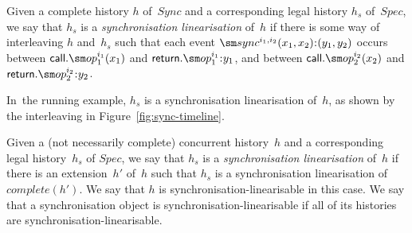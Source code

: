 \begin{definition}
Given a complete history $h$ of~$Sync$ and a corresponding legal history $h_s$
of~$Spec$, we say that $h_s$ is a \emph{synchronisation linearisation} of~$h$
if there is some way of interleaving $h$ and~$h_s$ such that each event
$\sync^{i_1, i_2}(x_1, x_2)\:: (y_1, y_2)$ occurs between
$\call.\op_1^{i_1}(x_1)$ and $\return.\op_1^{i_1}\::y_1$, and between
$\call.\op_2^{i_2}(x_2)$ and $\return.\op_2^{i_2}\::y_2$.
\end{definition}
%
In~the running example, $h_s$ is a synchronisation linearisation of~$h$,
as shown by the interleaving in Figure~\ref{fig:sync-timeline}.

\begin{definition}
Given a (not necessarily complete) concurrent history~$h$ and a corresponding
legal history~$h_s$ of $Spec$, we say that $h_s$ is a \emph{synchronisation
  linearisation} of~$h$ if there is an extension~$h'$ of~$h$ such that $h_s$
is a synchronisation linearisation of $complete(h')$.
%
We say that $h$ is synchronisation-linearisable in this case.  We say that a
synchronisation object is synchronisation-linearisable if all of its histories
are synchronisation-linearisable.
\end{definition}

